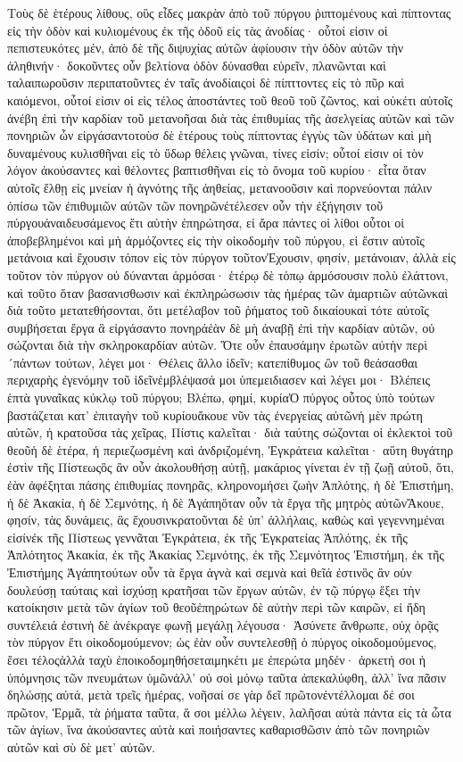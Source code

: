 Τοὺς δὲ ἑτέρους λίθους, οὓς εἶδες μακρὰν ἀπὸ τοῦ πύργου ῥιπτομένους καὶ πίπτοντας εἰς τὴν ὁδὸν καὶ κυλιομένους ἐκ τῆς ὁδοῦ εἰς τὰς ἀνοδίας· οὗτοί εἰσιν οἱ πεπιστευκότες μέν, ἀπὸ δὲ τῆς διψυχίας αὐτῶν ἀφίουσιν τὴν ὁδὸν αὐτῶν τὴν ἀληθινήν· δοκοῦντες οὖν βελτίονα ὁδὸν δύνασθαι εὑρεῖν, πλανῶνται καὶ ταλαιπωροῦσιν περιπατοῦντες ἐν ταῖς ἀνοδίαιςοἱ δὲ πίπττοντες εἰς τὸ πῦρ καὶ καιόμενοι, οὗτοί εἰσιν οἱ εἰς τέλος ἀποστάντες τοῦ θεοῦ τοῦ ζῶντος, καὶ οὐκέτι αὐτοῖς ἀνέβη ἐπὶ τὴν καρδίαν τοῦ μετανοῆσαι διὰ τὰς ἐπιθυμίας τῆς ἀσελγείας αὐτῶν καὶ τῶν πονηριῶν ὧν εἰργάσαντοτοὺσ δὲ ἑτέρους τοὺς πίπτοντας ἐγγὺς τῶν ὑδάτων καὶ μὴ δυναμένους κυλισθῆναι εἰς τὸ ὕδωρ θέλεις γνῶναι, τίνες εἰσίν; οὗτοί εἰσιν οἱ τὸν λόγον ἀκούσαντες καὶ θέλοντες βαπτισθῆναι εἰς τὸ ὄνομα τοῦ κυρίου· εἶτα ὅταν αὐτοῖς ἔλθῃ εἰς μνείαν ἡ ἁγνότης τῆς ἀηθείας, μετανοοῦσιν καὶ πορνεύονται πάλιν ὀπίσω τῶν ἐπιθυμιῶν αὐτῶν τῶν πονηρῶνἐτέλεσεν οὖν τὴν ἐξήγησιν τοῦ πύργουἀναιδευσάμενος ἔτι αὐτὴν ἐπηρώτησα, εἰ ἄρα πάντες οἱ λίθοι οὗτοι οἱ ἀποβεβλημένοι καὶ μὴ ἁρμόζοντες εἰς τὴν οἰκοδομὴν τοῦ πύργου, εἰ ἔστιν αὐτοῖς μετάνοια καὶ ἔχουσιν τόπον εἰς τὸν πύργον τοῦτονἘχουσιν, φησίν, μετάνοιαν, ἀλλὰ εἰς τοῦτον τὸν πύργον οὐ δύνανται ἁρμόσαι· ἑτέρῳ δὲ τὁπῳ ἁρμόσουσιν πολὺ ἐλάττονι, καὶ τοῦτο ὅταν βασανισθωσιν καὶ ἐκπληρώσωσιν τὰς ἡμέρας τῶν ἁμαρτιῶν αὐτῶνκαὶ διὰ τοῦτο μετατεθήσονται, ὅτι μετέλαβον τοῦ ῥήματος τοῦ δικαίουκαὶ τότε αὐτοῖς συμβήσεται ἔργα ἃ εἰργάσαντο πονηράἐὰν δὲ μὴ ἀναβῇ ἐπὶ τὴν καρδίαν αὐτῶν, οὐ σώζονται διὰ τὴν σκληροκαρδίαν αὐτῶν.
Ὅτε οὖν ἐπαυσάμην ἐρωτῶν αὐτὴν περὶ´πάντων τούτων, λέγει μοι· Θέλεις ἄλλο ἰδεῖν; κατεπίθυμος ὢν τοῦ θεάσασθαι περιχαρὴς ἐγενόμην τοῦ ἰδεῖνἐμβλέψασά μοι ὑπεμειδιασεν καὶ λέγει μοι· Βλέπεις ἑπτὰ γυναῖκας κύκλῳ τοῦ πύργου; Βλέπω, φημί, κυρίαὉ πύργος οὗτος ὑπὸ τούτων βαστάζεται κατ’ ἐπιταγὴν τοῦ κυρίουἄκουε νῦν τὰς ἐνεργείας αὐτῶνἡ μὲν πρώτη αὐτῶν, ἡ κρατοῦσα τὰς χεῖρας, Πίστις καλεῖται· διὰ ταύτης σώζονται οἱ ἐκλεκτοὶ τοῦ θεοῦἡ δὲ ἑτέρα, ἡ περιεζωσμένη καὶ ἀνδριζομένη, Ἐγκράτεια καλεῖται· αὕτη θυγάτηρ ἐστὶν τῆς Πίστεωςὃς ἂν οὖν ἀκολουθήσῃ αὐτῇ, μακάριος γίνεται ἐν τῇ ζωῇ αὐτοῦ, ὅτι, ἐὰν ἀφέξηται πάσης ἐπιθυμίας πονηρᾶς, κληρονομήσει ζωὴν Ἁπλότης, ἡ δὲ Ἐπιστήμη, ἡ δὲ Ἀκακία, ἡ δὲ Σεμνότης, ἡ δὲ Ἀγάπηὅταν οὖν τὰ ἔργα τῆς μητρὸς αὐτῶνἌκουε, φησίν, τὰς δυνάμεις, ἃς ἔχουσινκρατοῦνται δὲ ὑπ’ ἀλλήλαις, καθὼς καὶ γεγεννημέναι εἰσίνἐκ τῆς Πίστεως γεννᾶται Ἐγκράτεια, ἐκ τῆς Ἐγκρατείας Ἁπλότης, ἐκ τῆς Ἁπλότητος Ἀκακία, ἐκ τῆς Ἀκακίας Σεμνότης, ἐκ τῆς Σεμνότητος Ἐπιστήμη, ἐκ τῆς Ἐπιστήμης Ἀγάπητούτων οὖν τὰ ἔργα ἁγνὰ καὶ σεμνὰ καὶ θεῖά ἐστινὃς ἂν οὐν δουλεύσῃ ταύταις καὶ ἰσχύσῃ κρατῆσαι τῶν ἔργων αὐτῶν, ἐν τῷ πύργῳ ἕξει τὴν κατοίκησιν μετὰ τῶν ἁγίων τοῦ θεοῦἐπηρώτων δὲ αὐτὴν περὶ τῶν καιρῶν, εἰ ἤδη συντέλειά ἐστινἡ δὲ ἀνέκραγε φωνῇ μεγάλῃ λέγουσα· Ἀσύνετε ἄνθρωπε, οὐχ ὁρᾷς τὸν πύργον ἔτι οἰκοδομούμενον; ὡς ἐὰν οὖν συντελεσθῇ ὁ πύργος οἰκοδομούμενος, ἔσει τέλοςἀλλὰ ταχὺ ἐποικοδομηθήσεταιμηκέτι με ἐπερώτα μηδέν· ἀρκετή σοι ἡ ὑπόμνησις τῶν πνευμάτων ὑμῶνἀλλ’ οὐ σοὶ μόνῳ ταῦτα ἀπεκαλύφθη, ἀλλ’ ἵνα πᾶσιν δηλώσῃς αὐτά, μετὰ τρεῖς ἡμέρας, νοῆσαί σε γὰρ δεῖ πρῶτονἐντέλλομαι δέ σοι πρῶτον, Ἑρμᾶ, τὰ ῥήματα ταῦτα, ἅ σοι μέλλω λέγειν, λαλῆσαι αὐτὰ πάντα εἰς τὰ ὦτα τῶν ἁγίων, ἵνα ἀκούσαντες αὐτὰ καὶ ποιήσαντες καθαρισθῶσιν ἀπὸ τῶν πονηριῶν αὐτῶν καὶ σὺ δὲ μετ’ αὐτῶν.
